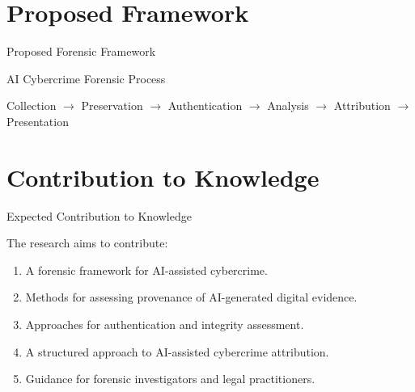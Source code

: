 \documentclass[aspectratio=169,11pt]{beamer}
\begin{document}
	
	\section{Proposed Framework}
	
	\begin{frame}{Proposed Forensic Framework}
		
		\begin{center}
			
			\begin{block}{AI Cybercrime Forensic Process}
				
				Collection
				$\rightarrow$
				Preservation
				$\rightarrow$
				Authentication
				$\rightarrow$
				Analysis
				$\rightarrow$
				Attribution
				$\rightarrow$
				Presentation
				
			\end{block}
			
		\end{center}
		
	\end{frame}
	
	
	\section{Contribution to Knowledge}
	
	\begin{frame}{Expected Contribution to Knowledge}
		
		The research aims to contribute:
		
		\begin{enumerate}
			
			\item A forensic framework for AI-assisted cybercrime.
			
			\item Methods for assessing provenance of AI-generated
			digital evidence.
			
			\item Approaches for authentication and integrity
			assessment.
			
			\item A structured approach to AI-assisted cybercrime
			attribution.
			
			\item Guidance for forensic investigators and
			legal practitioners.
			
		\end{enumerate}
		
	\end{frame}
	
\end{document}
